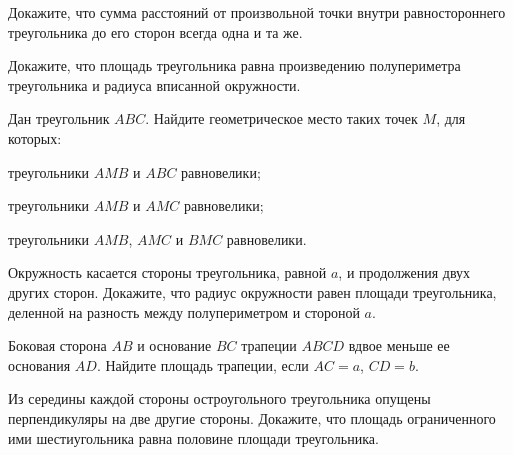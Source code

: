 \begin{tasks}
        \moditem{*} Докажите, что сумма расстояний от произвольной точки внутри равностороннего треугольника до его сторон всегда одна и та же.
    \item Докажите, что площадь треугольника равна произведению полупериметра треугольника и радиуса вписанной окружности.
    \item Дан треугольник $ABC$. Найдите геометрическое место таких точек $M$, для которых:
        \begin{tasks}
        \item треугольники $AMB$ и $ABC$ равновелики;
        \item треугольники $AMB$ и $AMC$ равновелики;
        \item треугольники $AMB$, $AMC$ и $BMC$ равновелики.
        \end{tasks}
    \item Окружность касается стороны треугольника, равной $a$, и продолжения двух других сторон. Докажите, что радиус окружности равен площади треугольника, деленной на разность между полупериметром и стороной $a$.
    \item Боковая сторона $AB$ и основание $BC$ трапеции $ABCD$ вдвое меньше ее основания $AD$. Найдите площадь трапеции, если $AC = a$, $CD = b$.
    \item Из середины каждой стороны остроугольного треугольника опущены перпендикуляры на две другие стороны. Докажите, что площадь ограниченного ими шестиугольника равна половине площади треугольника.

\end{tasks}
